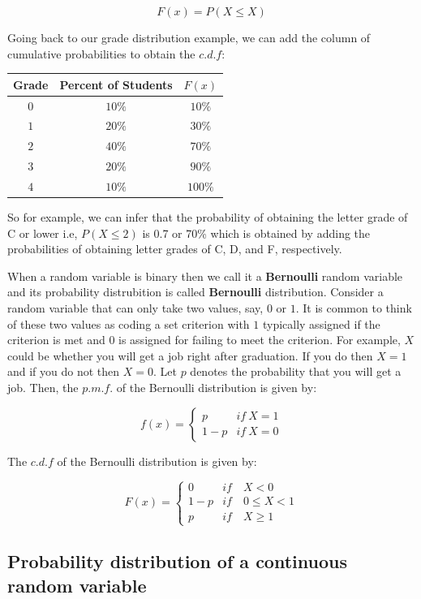 \documentclass[]{book}
\theoremstyle{definition}
\theoremstyle{definition}
\theoremstyle{definition}
\theoremstyle{remark}
\let\BeginKnitrBlock\begin \let\EndKnitrBlock\end
\begin{document}
\[F(x)=P(X\leq X)\]

Going back to our grade distribution example, we can add the column of cumulative probabilities to obtain the \(c.d.f\):

\begin{longtable}[]{@{}ccc@{}}
\toprule
Grade & Percent of Students & \(F(x)\)\tabularnewline
\midrule
\endhead
\(0\) & \(10\%\) & \(10\%\)\tabularnewline
\(1\) & \(20\%\) & \(30\%\)\tabularnewline
\(2\) & \(40\%\) & \(70\%\)\tabularnewline
\(3\) & \(20\%\) & \(90\%\)\tabularnewline
\(4\) & \(10\%\) & \(100\%\)\tabularnewline
\bottomrule
\end{longtable}

So for example, we can infer that the probability of obtaining the letter grade of C or lower i.e, \(P(X\leq 2)\) is 0.7 or 70\% which is obtained by adding the probabilities of obtaining letter grades of C, D, and F, respectively.

\BeginKnitrBlock{example}[Bernoulli Random Variable]
\protect\hypertarget{exm:unnamed-chunk-40}{}{\label{exm:unnamed-chunk-40} {} }When a random variable is binary then we call it a \textbf{Bernoulli} random variable and its probability distrubition is called \textbf{Bernoulli} distribution. Consider a random variable that can only take two values, say, \(0\) or \(1\). It is common to think of these two values as coding a set criterion with \(1\) typically assigned if the criterion is met and \(0\) is assigned for failing to meet the criterion. For example, \(X\) could be whether you will get a job right after graduation. If you do then \(X=1\) and if you do not then \(X=0\). Let \(p\) denotes the probability that you will get a job. Then, the \(p.m.f.\) of the Bernoulli distribution is given by:

\[f(x)=\begin{cases}
    p & if \ X=1\\
    1-p & if \ X=0
     \end{cases}\]

The \(c.d.f\) of the Bernoulli distribution is given by:

\[F(x)=\begin{cases}
    0 & if \quad X < 0\\
    1-p & if \quad 0\leq X<1\\
    p & if \quad  X\geq 1
     \end{cases}\]
\EndKnitrBlock{example}

\hypertarget{probability-distribution-of-a-continuous-random-variable}{%
\subsection{Probability distribution of a continuous random variable}\label{probability-distribution-of-a-continuous-random-variable}}
\end{document}
